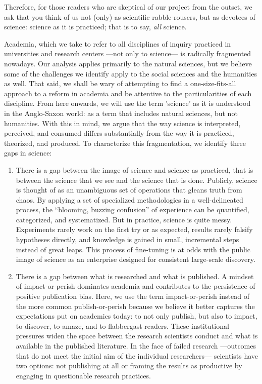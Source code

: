 \documentclass[twocolumn, serif]{jote-article}
\begin{document}
Therefore, for those readers who are skeptical of our project from the outset, we ask that you think of us not (only) as scientific rabble-rousers, but as devotees of science: science as it is practiced; that is to say, \emph{all} science.

\hypertarget{what-is-our-problem}{%

Academia, which we take to refer to all disciplines of inquiry practiced in universities and research centers ---not only to science--- is radically fragmented nowadays. Our analysis applies primarily to the natural sciences, but we believe some of the challenges we identify apply to the social sciences and the humanities as well. That said, we shall be wary of attempting to find a one-size-fits-all approach to a reform in academia and be attentive to the particularities of each discipline. From here onwards, we will use the term 'science' as it is understood in the Anglo-Saxon world: as a term that includes natural sciences, but not humanities. With this in mind, we argue that the way science is interpreted, perceived, and consumed differs substantially from the way it is practiced, theorized, and produced. To characterize this fragmentation, we identify three gaps in science: 
\begin{enumerate}
\item   There is a gap between the image of science and science as practiced,   that is between the science that we see and the science that is done.
  Publicly, science is thought of as an unambiguous set of operations   that gleans truth from chaos. By applying a set of specialized   methodologies in a well-delineated process, the ``blooming, buzzing   confusion'' of experience can be quantified, categorized, and   systematized. But in practice, science is quite messy. Experiments   rarely work on the first try or as expected, results rarely falsify   hypotheses directly, and knowledge is gained in small, incremental   steps instead of great leaps. This process of fine-tuning is at odds   with the public image of science as an enterprise designed for   consistent large-scale discovery.
\item   There is a gap between what is researched and what is published. A   mindset of impact-or-perish dominates academia and contributes to the   persistence of positive publication bias. Here, we use the term   impact-or-perish instead of the more common publish-or-perish because   we believe it better captures the expectations put on academics today:   to not only publish, but also to impact, to discover, to amaze, and to   flabbergast readers. These institutional pressures widen the space   between the research scientists conduct and what is available in the   published literature. In the face of failed research ---outcomes that   do not meet the initial aim of the individual researchers---   scientists have two options: not publishing at all or framing the   results as productive by engaging in questionable research practices.

\end{enumerate}}
\end{document}
